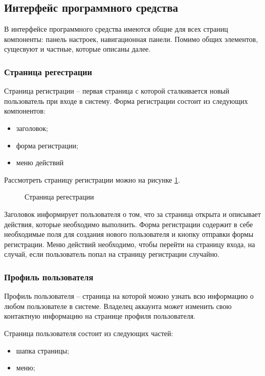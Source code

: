 \subsection{Интерфейс программного средства}

В интерфейсе программного средства имеются общие для всех страниц компоненты: панель настроек, навигационная панели. Помимо общих
элементов, сущесвуют и частные, которые описаны далее.

\subsubsection{Страница регестрации}

Страница регистрации -- первая страница с которой сталкивается новый пользователь при входе в систему.
Форма регистрации состоит из следующих компонентов:
\begin{itemize}
    \item заголовок;
    \item форма регистрации;
    \item меню действий
\end{itemize}

Рассмотреть страницу регистрации можно на рисунке \ref{fig:register}.

\begin{figure}[ht]
    \centering
    \caption{Страница регестрации}
    \label{fig:register}
\end{figure}

Заголовок информирует пользователя о том, что за страница открыта и описывает действия, которые необходимо выполнить. Форма регистрации 
содержит в себе необходимые поля для создания нового пользователя и кнопку отправки формы регистрации. Меню действий необходимо, чтобы
перейти на страницу входа, на случай, если пользователь попал на страницу регистрации случайно.

\subsubsection{Профиль пользователя}

Профиль пользователя -- страница на которой можно узнать всю информацию о любом пользователе в системе. Владелец аккаунта может изменить
свою контактную информацию на странице профиля пользователя.

Страница пользователя состоит из следующих частей:
\begin{itemize}
    \item шапка страницы;
    \item меню;
\end{itemize}

